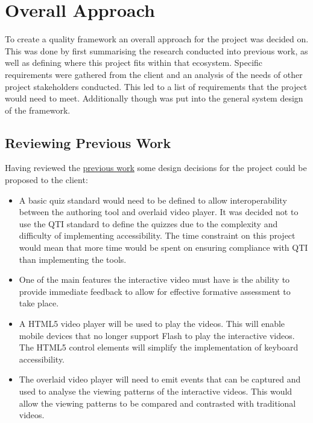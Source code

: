 \chapter{Overall Approach} 
\label{Chapter:Overall Approach}

\begin{preamble}
	To create a quality framework an overall approach for the project was decided on. \\ This was done by first summarising the research conducted into previous work, as well as defining where this project fits within that ecosystem. Specific requirements were gathered from the client and an analysis of the needs of other project stakeholders conducted. This led to a list of requirements that the project would need to meet. Additionally though was put into the general system design of the framework.
\end{preamble}

\section{Reviewing Previous Work}
Having reviewed the \href{Chapter:Previous Work}{previous work} some design decisions for the project could be proposed to the client:
\begin{itemize}
\item A basic quiz standard would need to be defined to allow interoperability between the authoring tool and overlaid video player. It was decided not to use the \gls{QTI} standard to define the quizzes due to the complexity and difficulty of implementing accessibility. The time constraint on this project would mean that more time would be spent on ensuring compliance with \gls{QTI} than implementing the tools.
\item One of the main features the interactive video must have is the ability to provide immediate feedback to allow for effective formative assessment to take place.
\item A HTML5 video player will be used to play the videos. This will enable mobile devices that no longer support Flash to play the interactive videos. The HTML5 control elements will simplify the implementation of keyboard accessibility.
\item The overlaid video player will need to emit events that can be captured and used to analyse the viewing patterns of the interactive videos. This would allow the viewing patterns to be compared and contrasted with traditional videos.
\end{itemize}

